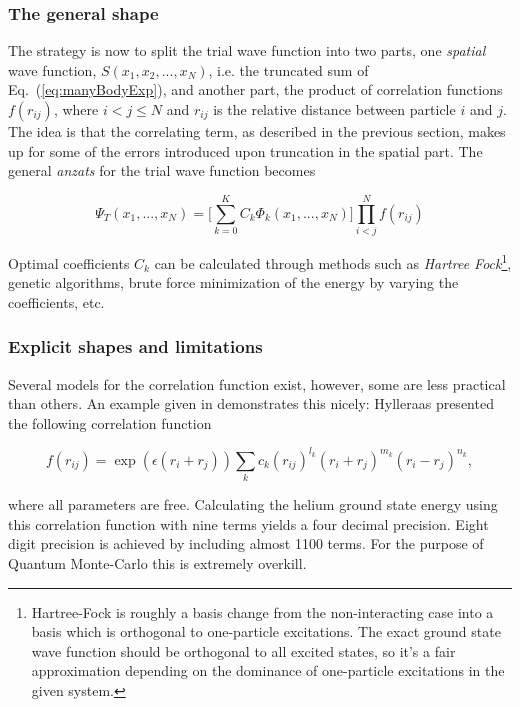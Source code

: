 \subsubsection{The general shape}

The strategy is now to split the trial wave function into two parts, one \textit{spatial} wave function, $S(x_1, x_2, ..., x_N)$, i.e. the truncated sum of Eq.~(\ref{eq:manyBodyExp}), and another part, the product of correlation functions $f(r_{ij})$, where $i < j \le N$ and $r_{ij}$ is the relative distance between particle $i$ and $j$. The idea is that the correlating term, as described in the previous section, makes up for some of the errors introduced upon truncation in the spatial part. The general \textit{anzats} for the trial wave function becomes

\begin{equation}
\label{eq:firstAnzatsTWF}
 \Psi_T(x_1, ..., x_N) = \Big[\sum_{k=0}^K C_k\Phi_k(x_1, ..., x_N)\Big]\prod_{i<j}^Nf(r_{ij})
\end{equation}

Optimal coefficients $C_k$ can be calculated through methods such as \textit{Hartree Fock}\footnote{Hartree-Fock is roughly a basis change from the non-interacting case into a basis which is orthogonal to one-particle excitations. The exact ground state wave function should be orthogonal to all excited states, so it's a fair approximation depending on the dominance of one-particle excitations in the given system.}, genetic algorithms, brute force minimization of the energy by varying the coefficients, etc.

\subsubsection{Explicit shapes and limitations}

Several models for the correlation function exist, however, some are less practical than others. An example given in \cite{morten} demonstrates this nicely: Hylleraas presented the following correlation function 

\begin{equation}
 f(r_{ij}) = \exp(\epsilon (r_i + r_j))\sum_k c_k(r_{ij})^{l_k} (r_i + r_j)^{m_k}(r_i - r_j)^{n_k},
\end{equation}

where all parameters are free. Calculating the helium ground state energy using this correlation function with nine terms yields a four decimal precision. Eight digit precision is achieved by including almost 1100 terms. For the purpose of Quantum Monte-Carlo this is extremely overkill. 

